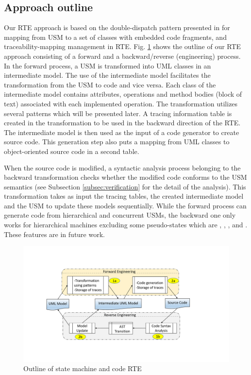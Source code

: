\subsection{Approach outline}
Our RTE approach is based on the double-dispatch pattern presented in \cite{spinke_object-oriented_2013} for mapping from USM to a set of classes with embedded code fragments, and traceability-mapping management in RTE. Fig. \ref{fig:outline} shows the outline of our RTE approach consisting of a forward and a backward/reverse (engineering) process. In the forward process, a USM is transformed into UML classes in an intermediate model. The use of the intermediate model facilitates the transformation from the USM to code and vice versa. Each class of the intermediate model contains attributes, operations and method bodies (block of text) associated with each implemented operation. The transformation utilizes several patterns which will be presented later. A tracing information table is created in the transformation to be used in the backward direction of the RTE. The intermediate model is then used as the input of a code generator to create source code. This generation step also puts a mapping from UML classes to object-oriented source code in a second table.

When the source code is modified, a syntactic analysis process belonging to the backward transformation checks whether the modified code conforms to the USM semantics (see Subsection \ref{subsec:verification} for the detail of the analysis). This transformation takes as input the tracing tables, the created intermediate model and the USM to update these models sequentially. While the forward process can generate code from hierarchical and concurrent USMs, the backward one only works for hierarchical machines excluding some pseudo-states which are , , ,  and . These features are in future work.

\begin{figure}
\centering
\includegraphics[clip, trim=3.5cm 3.5cm 5.9cm 3.5cm, width=1\columnwidth]{figures/flowchart.pdf}
\caption{Outline of state machine and code RTE} 
\label{fig:outline}
\end{figure}

